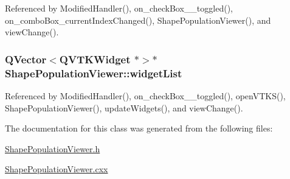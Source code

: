 Referenced by Modified\-Handler(), on\-\_\-check\-Box\-\_\-\_\-toggled(), on\-\_\-combo\-Box\-\_\-current\-Index\-Changed(), Shape\-Population\-Viewer(), and view\-Change().

\hypertarget{class_shape_population_viewer_adaf84d2191b3d5452455bf43864ad2f2}{
\subsubsection[{widget\-List}]{\setlength{\rightskip}{0pt plus 5cm}Q\-Vector$<$Q\-V\-T\-K\-Widget $\ast$$>$$\ast$ Shape\-Population\-Viewer\-::widget\-List\hspace{0.3cm}{\ttfamily [protected]}}}\label{class_shape_population_viewer_adaf84d2191b3d5452455bf43864ad2f2}


Referenced by Modified\-Handler(), on\-\_\-check\-Box\-\_\-\_\-toggled(), open\-V\-T\-K\-S(), Shape\-Population\-Viewer(), update\-Widgets(), and view\-Change().



The documentation for this class was generated from the following files\-:\begin{DoxyCompactItemize}
\item 
\hyperlink{_shape_population_viewer_8h}{Shape\-Population\-Viewer.\-h}\item 
\hyperlink{_shape_population_viewer_8cxx}{Shape\-Population\-Viewer.\-cxx}\end{DoxyCompactItemize}
